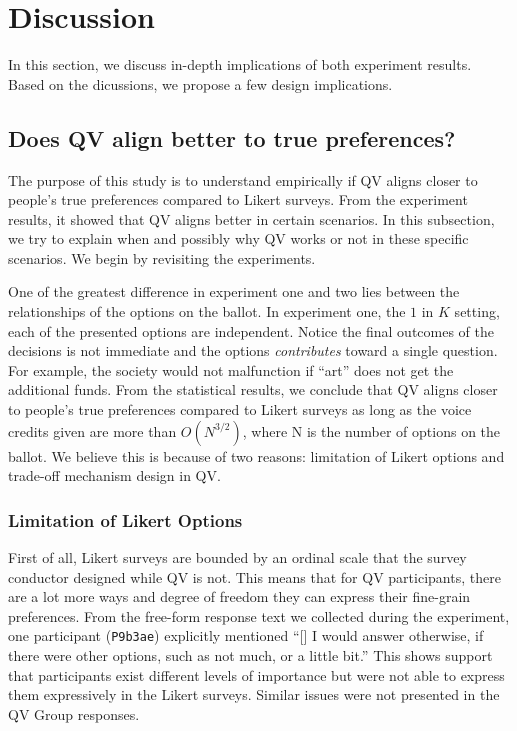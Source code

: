 \section{Discussion} \label{discussion}
In this section, 
we discuss in-depth implications 
of both experiment results.
Based on the dicussions,
we propose a few design implications.

\subsection{Does QV align better to true preferences?}
The purpose of this study is to 
understand empirically if
QV aligns closer to people's true preferences 
compared to Likert surveys.
From the experiment results,
it showed that QV aligns better 
in certain scenarios.
In this subsection,
we try to explain when and possibly why
QV works or not in these specific scenarios.
We begin by revisiting the experiments.

One of the greatest difference
in experiment one and two
lies between the relationships of
the options on the ballot.
In experiment one,
the $1$ in $K$ setting,
each of the presented options
are independent.
Notice the final outcomes 
of the decisions
is not immediate and 
the options \textit{contributes}
toward a single question.
For example,
the society would not malfunction if ``art''
does not get the additional funds.
From the statistical results, we conclude that QV aligns closer to people's true preferences
compared to Likert surveys
as long as the voice credits given
are more than $O(N^{3/2})$, where N is the number of options on the ballot.
We believe this is because of two reasons:
limitation of Likert options and
trade-off mechanism design in QV.

\subsubsection{Limitation of Likert Options}
First of all, 
Likert surveys are bounded by an ordinal scale 
that the survey conductor designed while QV is not.
This means that 
for QV participants,
there are a lot more ways
and degree of freedom
they can express
their fine-grain preferences.
From the free-form response text we collected
during the experiment,
one participant (\texttt{P9b3ae}) explicitly mentioned ``[\textellipsis] I would answer otherwise, if there were other options, such as not much, or a little bit.''
This shows support that
participants exist different levels of importance 
but were not able to express them expressively 
in the Likert surveys.
Similar issues were not presented
in the QV Group responses.

